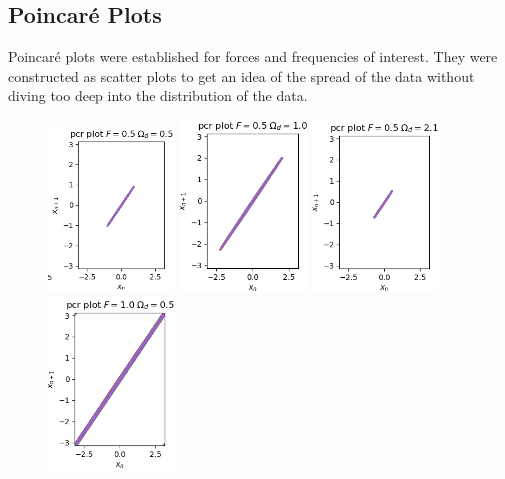\documentclass[11pt]{article} %
\begin{document}
    \subsection{Poincar\'e Plots}
    Poincar\'e plots were established for forces and frequencies of interest. They were constructed as scatter plots to get an idea of the spread
    of the data without diving too deep into the distribution of the data.
    \begin{figure}[H]
        \centering
        \includegraphics[width=0.3\textwidth]{pcp_0.5_0.5.png}
        \includegraphics[width=0.3\textwidth]{pcp_0.5_1.0.png}
        \includegraphics[width=0.3\textwidth]{pcp_0.5_2.0.png}
        \includegraphics[width=0.3\textwidth]{pcp_1.0_0.5.png}

\end{figure}
\end{document}
